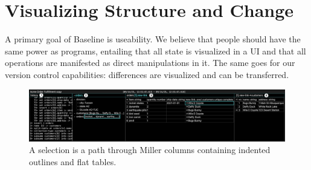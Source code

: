 \documentclass[english,submission]{programming}
\theoremstyle{definition}
\newcommand{\citet}[1]{\citeauthor*{#1}~\cite{#1}}
\begin{document}



\acks

\appendix


\section{Visualizing Structure and Change}\label{UI}

A primary goal of Baseline is useability. We believe that people should have the same power as programs, entailing that all state is visualized in a UI and that all operations are manifested as direct manipulations in it. The same goes for our version control capabilities: differences are visualized and can be transferred.

\begin{figure}
\includegraphics[width=\textwidth]{GUInumbered.png}
\caption{A selection is a path through Miller columns containing indented outlines and flat tables.}
\label{fig:UI}
\end{figure}
\end{document}
